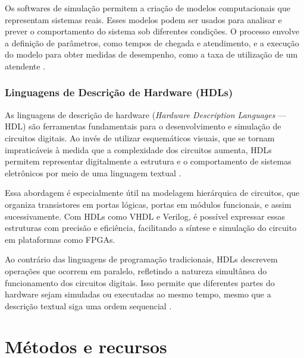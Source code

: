 \documentclass[
	12pt,				%
	openright,			%
	oneside,			%
	a4paper,			%
	english,			%
	french,				%
	spanish,			%
	brazil,				%
	]{abntex2}
\begin{document}
Os softwares de simulação permitem a criação de modelos computacionais que representam sistemas reais. Esses modelos podem ser usados para analisar e prever o comportamento do sistema sob diferentes condições. O processo envolve a definição de parâmetros, como tempos de chegada e atendimento, e a execução do modelo para obter medidas de desempenho, como a taxa de utilização de um atendente \cite{chwif_modelagem_2014}.
\subsection{Linguagens de Descrição de Hardware (HDLs)}

As linguagens de descrição de hardware (\textit{Hardware Description Languages} — HDL) são ferramentas fundamentais para o desenvolvimento e simulação de circuitos digitais. Ao invés de utilizar esquemáticos visuais, que se tornam impraticáveis à medida que a complexidade dos circuitos aumenta, HDLs permitem representar digitalmente a estrutura e o comportamento de sistemas eletrônicos por meio de uma linguagem textual \cite{keim_what_2020}.

Essa abordagem é especialmente útil na modelagem hierárquica de circuitos, que organiza transistores em portas lógicas, portas em módulos funcionais, e assim sucessivamente. Com HDLs como VHDL e Verilog, é possível expressar essas estruturas com precisão e eficiência, facilitando a síntese e simulação do circuito em plataformas como FPGAs.

Ao contrário das linguagens de programação tradicionais, HDLs descrevem operações que ocorrem em paralelo, refletindo a natureza simultânea do funcionamento dos circuitos digitais. Isso permite que diferentes partes do hardware sejam simuladas ou executadas ao mesmo tempo, mesmo que a descrição textual siga uma ordem sequencial \cite{keim_what_2020}.

\chapter{Métodos e recursos}\label{metodos_e_recursos}
\end{document}
